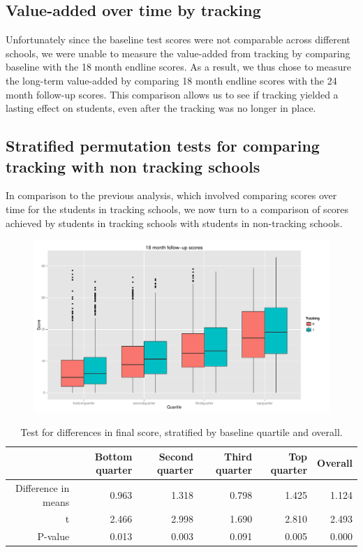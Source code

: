\documentclass[11pt]{article}
\begin{document}
 \subsection{Value-added over time by tracking}
Unfortunately since the baseline test scores were not comparable across different schools, we were unable to measure the value-added from tracking by comparing baseline with the 18 month endline scores. As a result, we thus chose to measure the long-term value-added by comparing 18 month endline scores with the 24 month follow-up scores. This comparison allows us to see if tracking yielded a lasting effect on students, even after the tracking was no longer in place.



 \subsection{Stratified permutation tests for comparing tracking with non tracking schools}
In comparison to the previous analysis, which involved comparing scores over time for the students in tracking schools, we now turn to a comparison of scores achieved by students in tracking schools with students in non-tracking schools.
 
  \begin{figure}[H]
 \centering
 \includegraphics[scale=0.5]{tracking-stratif.pdf}
 \caption{}
 \label{fig:tracking-stratif}
 \end{figure} 
\begin{table}[ht]
\centering
\begin{tabular}{rrrrrr}
  \hline
 & Bottom quarter & Second quarter & Third quarter & Top quarter & Overall \\ 
  \hline
Difference in means & 0.963 & 1.318 & 0.798 & 1.425 & 1.124 \\ 
  t & 2.466 & 2.998 & 1.690 & 2.810 & 2.493 \\ 
  P-value & 0.013 & 0.003 & 0.091 & 0.005 & 0.000 \\ 
   \hline
\end{tabular}
\caption{Test for differences in final score, stratified by baseline quartile and overall.} 
\end{table} %
\end{document}
